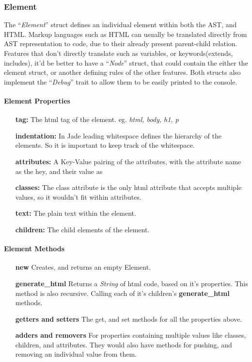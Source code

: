 \subsubsection{Element}
The ``\textit{Element}'' struct defines an individual element within both the AST, and HTML. Markup languages such as HTML can usually be translated directly from AST representation to code, due to their already present parent-child relation. Features that don't directly translate such as variables, or keywords(extends, includes), it'd be better to have a ``\textit{Node}'' struct, that could contain the either the element struct, or another defining rules of the other features. Both structs also implement the ``\textit{Debug}'' trait to allow them to be easily printed to the console.

\paragraph{Element Properties}
\begin{itemize}
    \item[\textbf{tag:}] The html tag of the element. eg. \textit{html, body, h1, p}
    \item[\textbf{indentation:}] In Jade leading whitespace defines the hierarchy of the elements. So it is important to keep track of the whitespace.
    \item[\textbf{attributes:}] A Key-Value pairing of the attributes, with the attribute name as the hey, and their value as 
    \item[\textbf{classes:}] The class attribute is the only html attribute that accepts multiple values, so it wouldn't fit within attributes.
    \item[\textbf{text:}] The plain text within the element.
    \item[\textbf{children:}] The child elements of the element.
\end{itemize}

\paragraph{Element Methods}
\begin{itemize}
    \item[\textbf{new}] Creates, and returns an empty Element.
    \item[\textbf{generate\_html}] Returns a \textit{String} of html code, based on it's properties. This method is also recursive. Calling each of it's children's \textbf{generate\_html} methods.
    \item[\textbf{getters and setters}] The get, and set methods for all the properties above.
    \item[\textbf{adders and removers}] For properties containing multiple values like classes, children, and attributes. They would also have methods for pushing, and removing an individual value from them.
\end{itemize}

